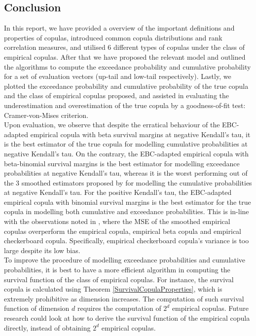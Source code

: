 \documentclass[12pt]{report}
\newcommand{\1}{\mathbf{1}}
\begin{document}
\begin{flushleft}
\section{Conclusion}
\vspace{0.5cm}
In this report, we have provided a overview of the important definitions and properties of copulas, introduced common copula distributions and rank correlation measures, and utilised 6 different types of copulas under the class of empirical copulas. After that we have proposed the relevant model and outlined the algorithms to compute the exceedance probability and cumulative probability for a set of evaluation vectors (up-tail and low-tail respectively). Lastly, we plotted the exceedance probability and cumulative probability of the true copula and the class of empirical copulas proposed, and assisted in evaluating the underestimation and overestimation of the true copula by a goodness-of-fit test: Cramer-von-Mises criterion.\\
\vspace{0.5cm}
Upon evaluation, we observe that despite the erratical behaviour of the EBC-adapted empirical copula with beta survival margins at negative Kendall's tau, it is the best estimator of the true copula for modelling cumulative probabilities at negative Kendall's tau. On the contrary, the EBC-adapted empirical copula with beta-binomial survival margins is the best estimator for modelling exceedance probabilities at negative Kendall's tau, whereas it is the worst performing out of the 3 smoothed estimators proposed by \cite{KojadinovicYi2024Smooth} for modelling the cumulative probabilities at negative Kendall's tau. For the positive Kendall's tau, the EBC-adapted empirical copula with binomial survival margins is the best estimator for the true copula in modelling both cumulative and exceedance probabilities. This is in-line with the observations noted in \cite{KojadinovicYi2024Smooth}, where the MSE of the smoothed empirical copulas overperform the empirical copula, empirical beta copula and empirical checkerboard copula. Specifically, empirical checkerboard copula's variance is too large despite its low bias.\\
\vspace{0.5cm}
To improve the procedure of modelling exceedance probabilities and cumulative probabilities, it is best to have a more efficient algorithm in computing the survival function of the class of empirical copulas. For instance, the survival copula is calculated using Theorem \ref{SurvivalCopulaProperties}, which is extremely prohibitive as dimension increases. The computation of such survival function of dimension $d$ requires the computation of $2^{d}$ empirical copulas. Future research could look at how to derive the survival function of the empirical copula directly, instead of obtaining $2^{d}$ empirical copulas.\\

\end{flushleft}
\end{document}
